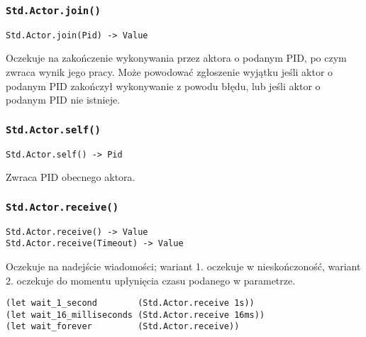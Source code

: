 \subsubsection{\texttt{Std.Actor.join()}}
\label{Std_Actor_join}

\begin{small}
\begin{lstlisting}
Std.Actor.join(Pid) -> Value
\end{lstlisting}
\end{small}

Oczekuje na zakończenie wykonywania przez aktora o podanym PID, po czym zwraca wynik jego pracy.
Może powodować zgłoszenie wyjątku jeśli aktor o podanym PID zakończył wykonywanie z powodu błędu, lub jeśli aktor
o podanym PID nie istnieje.

\subsubsection{\texttt{Std.Actor.self()}}

\begin{small}
\begin{lstlisting}
Std.Actor.self() -> Pid
\end{lstlisting}
\end{small}

Zwraca PID obecnego aktora.

\subsubsection{\texttt{Std.Actor.receive()}}

\begin{small}
\begin{lstlisting}
Std.Actor.receive() -> Value
Std.Actor.receive(Timeout) -> Value
\end{lstlisting}
\end{small}

Oczekuje na nadejście wiadomości; wariant 1. oczekuje w nieskończoność,
wariant 2. oczekuje do momentu upłynięcia czasu podanego w parametrze.

\begin{small}
\begin{lstlisting}
(let wait_1_second        (Std.Actor.receive 1s))
(let wait_16_milliseconds (Std.Actor.receive 16ms))
(let wait_forever         (Std.Actor.receive))
\end{lstlisting}
\end{small}

